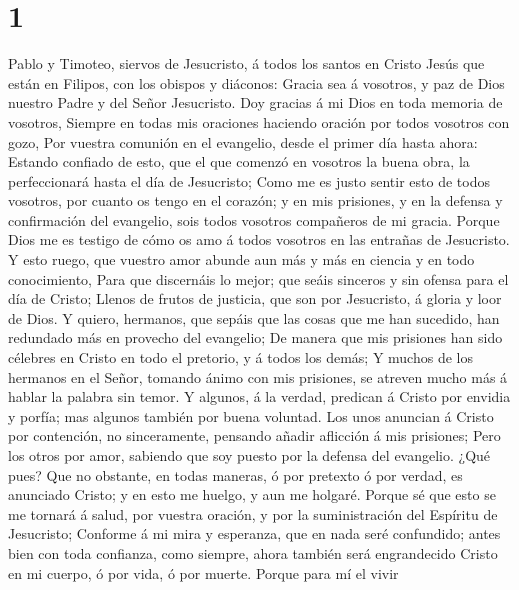 \hypertarget{section}{%
\section{1}\label{section}}

 Pablo y Timoteo, siervos de Jesucristo, á todos los santos
en Cristo Jesús que están en Filipos, con los obispos y diáconos:
 Gracia sea á vosotros, y paz de Dios nuestro Padre y del
Señor Jesucristo.  Doy gracias á mi Dios en toda memoria de
vosotros,  Siempre en todas mis oraciones haciendo oración
por todos vosotros con gozo,  Por vuestra comunión en el
evangelio, desde el primer día hasta ahora:  Estando
confiado de esto, que el que comenzó en vosotros la buena obra, la
perfeccionará hasta el día de Jesucristo;  Como me es justo
sentir esto de todos vosotros, por cuanto os tengo en el corazón; y en
mis prisiones, y en la defensa y confirmación del evangelio, sois todos
vosotros compañeros de mi gracia.  Porque Dios me es testigo
de cómo os amo á todos vosotros en las entrañas de Jesucristo.
 Y esto ruego, que vuestro amor abunde aun más y más en
ciencia y en todo conocimiento,  Para que discernáis lo
mejor; que seáis sinceros y sin ofensa para el día de Cristo;
 Llenos de frutos de justicia, que son por Jesucristo, á
gloria y loor de Dios.  Y quiero, hermanos, que sepáis que
las cosas que me han sucedido, han redundado más en provecho del
evangelio;  De manera que mis prisiones han sido célebres
en Cristo en todo el pretorio, y á todos los demás;  Y
muchos de los hermanos en el Señor, tomando ánimo con mis prisiones, se
atreven mucho más á hablar la palabra sin temor.  Y
algunos, á la verdad, predican á Cristo por envidia y porfía; mas
algunos también por buena voluntad.  Los unos anuncian á
Cristo por contención, no sinceramente, pensando añadir aflicción á mis
prisiones;  Pero los otros por amor, sabiendo que soy
puesto por la defensa del evangelio.  ¿Qué pues? Que no
obstante, en todas maneras, ó por pretexto ó por verdad, es anunciado
Cristo; y en esto me huelgo, y aun me holgaré.  Porque sé
que esto se me tornará á salud, por vuestra oración, y por la
suministración del Espíritu de Jesucristo;  Conforme á mi
mira y esperanza, que en nada seré confundido; antes bien con toda
confianza, como siempre, ahora también será engrandecido Cristo en mi
cuerpo, ó por vida, ó por muerte.  Porque para mí el vivir
